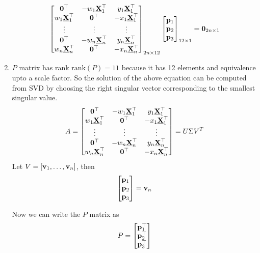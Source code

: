 \documentclass[times,singlecolumn]{article}
\begin{document}
\begin{enumerate}
       \[
         \begin{bmatrix}
           \mathbf{0}^\top & -w_1 \underline{\mathbf{X}}_1^\top & y_1 \underline{\mathbf{X}}_1^\top \\
           w_1 \underline{\mathbf{X}}_1^\top & \mathbf{0}^\top  & -x_1 \underline{\mathbf{X}}_1^\top \\
           \vdots & \vdots & \vdots\\
           \mathbf{0}^\top & -w_n \underline{\mathbf{X}}_n^\top & y_n \underline{\mathbf{X}}_n^\top \\
           w_n \underline{\mathbf{X}}_n^\top & \mathbf{0}^\top  & -x_n \underline{\mathbf{X}}_n^\top \\
         \end{bmatrix}_{2n \times 12}
         \begin{bmatrix}
           \mathbf{p}_1 \\
           \mathbf{p}_2 \\
           \mathbf{p}_3
         \end{bmatrix}_{12 \times 1}
         = \mathbf{0}_{2n \times 1}
       \]
   \item $P$ matrix has rank $\text{rank}(P) = 11$ because it has 12 elements
     and equivalence upto a scale factor. So the solution of the above equation
     can be computed from SVD by choosing the right singular vector corresponding
     to the smallest singular value.
     \[
      A = \begin{bmatrix}
        \mathbf{0}^\top & -w_1 \underline{\mathbf{X}}_1^\top & y_1 \underline{\mathbf{X}}_1^\top \\
        w_1 \underline{\mathbf{X}}_1^\top & \mathbf{0}^\top  & -x_1 \underline{\mathbf{X}}_1^\top \\
        \vdots & \vdots & \vdots\\
        \mathbf{0}^\top & -w_n \underline{\mathbf{X}}_n^\top & y_n \underline{\mathbf{X}}_n^\top \\
        w_n \underline{\mathbf{X}}_n^\top & \mathbf{0}^\top  & -x_n \underline{\mathbf{X}}_n^\top \\
       \end{bmatrix} = U\Sigma V^T
     \]
     Let $V = [\mathbf{v}_1, \dots, \mathbf{v}_n]$, then
     \[
       \begin{bmatrix}
         \mathbf{p}_1 \\
         \mathbf{p}_2 \\
         \mathbf{p}_3
         \end{bmatrix} = \mathbf{v}_n
       \]

       Now we can write the $P$ matrix as
       \[
         P = \begin{bmatrix}
           \mathbf{p}_1^\top \\
           \mathbf{p}_2^\top \\
           \mathbf{p}_3^\top
         \end{bmatrix}
         \]
\end{enumerate}
\end{document}
